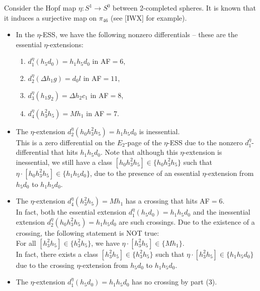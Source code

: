 \documentclass{amsart}
\numberwithin{equation}{section}
\begin{document}
\begin{example}
    Consider the Hopf map $\eta:S^1 \rightarrow S^0$ between 2-completed spheres. It is known that it induces a surjective map on $\pi_{46}$ (see [IWX] for example). 
    \begin{itemize}[leftmargin=1cm]
        \item In the $\eta$-ESS, we have the following nonzero differentials -- these are the essential $\eta$-extensions:
    \begin{enumerate}
        \item $d_1^\eta(h_5d_0) = h_1h_5d_0$ in AF$=6$,
        \item $d_2^\eta(\Delta h_1g) = d_0l$ in AF$=11$,
        \item $d_3^\eta(h_1g_2) = \Delta h_2c_1$ in AF$=8$,
        \item $d_4^\eta(h_3^2 h_5) = Mh_1$ in AF$=7$.\\
    \end{enumerate}
    
    \item The $\eta$-extension $d_2^\eta (h_0h_3^2h_5) = h_1h_5d_0$ is inessential.\\
    
        This is a zero differential on the $E_2$-page of the $\eta$-ESS due to the nonzero $d_1^\eta$-differential that hits $h_1h_5d_0$. Note that although this $\eta$-extension is inessential, we still have a class $[h_0h_3^2h_5] \in \{h_0h_3^2h_5\}$ such that $\eta \cdot [h_0h_3^2h_5] \in \{h_1h_5d_0\}$, due to the presence of an essential $\eta$-extension from $h_5d_0$ to $h_1h_5d_0$.\\
    
    \item The $\eta$-extension $d_4^\eta(h_3^2 h_5) = Mh_1$ has a crossing that hits AF$=6$.\\ 
    
    In fact, both the essential extension $d_1^\eta(h_5d_0) = h_1h_5d_0$ and the inessential extension $d_2^\eta (h_0h_3^2h_5) = h_1h_5d_0$ are such crossings. Due to the existence of a crossing, the following statement is NOT true:\\

    For all $[h_3^2 h_5] \in \{h_3^2 h_5\}$, we have $\eta \cdot [h_3^2 h_5] \in \{Mh_1\}$.\\

    In fact, there exists a class $[h_3^2 h_5] \in \{h_3^2 h_5\}$ such that $\eta \cdot [h_3^2 h_5] \in \{h_1h_5d_0\}$ due to the crossing $\eta$-extension from $h_5d_0$ to $h_1h_5d_0$.\\

    \item The $\eta$-extension $d_1^\eta(h_5d_0) = h_1h_5d_0$ has no crossing by part (3).
   
 \end{itemize}
\end{example}
  
\end{document}
